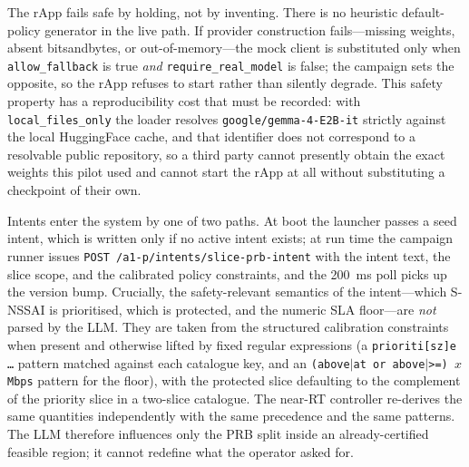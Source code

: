 The rApp fails safe by holding, not by inventing. There is no heuristic default-policy generator in the live path. If provider construction fails---missing weights, absent bitsandbytes, or out-of-memory---the mock client is substituted only when \texttt{allow\_fallback} is true \emph{and} \texttt{require\_real\_model} is false; the campaign sets the opposite, so the rApp refuses to start rather than silently degrade. This safety property has a reproducibility cost that must be recorded: with \texttt{local\_files\_only} the loader resolves \texttt{google/gemma-4-E2B-it} strictly against the local HuggingFace cache, and that identifier does not correspond to a resolvable public repository, so a third party cannot presently obtain the exact weights this pilot used and cannot start the rApp at all without substituting a checkpoint of their own.

Intents enter the system by one of two paths. At boot the launcher passes a seed intent, which is written only if no active intent exists; at run time the campaign runner issues \texttt{POST /a1-p/intents/slice-prb-intent} with the intent text, the slice scope, and the calibrated policy constraints, and the 200~ms poll picks up the version bump. Crucially, the safety-relevant semantics of the intent---which S-NSSAI is prioritised, which is protected, and the numeric SLA floor---are \emph{not} parsed by the LLM. They are taken from the structured calibration constraints when present and otherwise lifted by fixed regular expressions (a \texttt{prioriti[sz]e \dots} pattern matched against each catalogue key, and an \texttt{(above$\vert$at or above$\vert$>=) $x$ Mbps} pattern for the floor), with the protected slice defaulting to the complement of the priority slice in a two-slice catalogue. The near-RT controller re-derives the same quantities independently with the same precedence and the same patterns. The LLM therefore influences only the PRB split inside an already-certified feasible region; it cannot redefine what the operator asked for.

